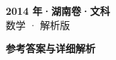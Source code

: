 \documentclass[zihao=-4, a4paper]{ctexart}
\begin{document}
\begin{center}
  {\Large\bfseries 2014 年·湖南卷·文科}\\[4pt]
  {\large 数学 · 解析版}
\end{center}
\medskip
{}

\clearpage
{}
\begin{center}{\Large\bfseries 参考答案与详细解析}\end{center}
\medskip

\end{document}
